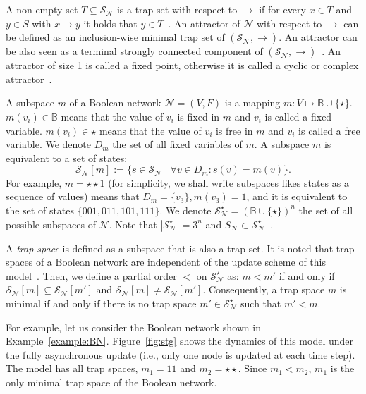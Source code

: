 \documentclass[preprint,12pt]{elsarticle}
\begin{document}
A non-empty set \(T \subseteq \mathcal{S}_{\mathcal{N}}\) is a trap set with respect to \(\rightarrow\) if for every \(x \in T\) and \(y \in S\) with \(x \rightarrow y\) it holds that \(y \in T\)~\cite{klarner2015computing}.
An attractor of \(\mathcal{N}\) with respect to \(\rightarrow\) can be defined as an inclusion-wise minimal trap set of \((\mathcal{S}_{\mathcal{N}}, \rightarrow)\).
An attractor can be also seen as a terminal strongly connected component of \((\mathcal{S}_{\mathcal{N}}, \rightarrow)\)~\cite{chatain2014characterization}.
An attractor of size 1 is called a fixed point, otherwise it is called a cyclic or complex attractor~\cite{klarner2015computing}.

A subspace \(m\) of a Boolean network \(\mathcal{N} = (V, F)\) is a mapping \(m \colon V \mapsto \mathbb{B} \cup \{\star\}\).
\(m(v_i) \in \mathbb{B}\) means that the value of \(v_i\) is fixed in \(m\) and \(v_i\) is called a fixed variable.
\(m(v_i) \in \star\) means that the value of \(v_i\) is free in \(m\) and \(v_i\) is called a free variable.
We denote \(D_m\) the set of all fixed variables of \(m\).
A subspace \(m\) is equivalent to a set of states:
\[
\mathcal{S}_{\mathcal{N}}[m] := \{s \in \mathcal{S}_{\mathcal{N}} \mid \forall v \in D_m \colon s(v) = m(v)\}.
\] For example, \(m = \star\star1\) (for simplicity, we shall write subspaces likes states as a sequence of values) means that \(D_m = \{v_3\}, m(v_3) = 1\), and it is equivalent to the set of states \(\{001, 011, 101, 111\}\).
We denote \(\mathcal{S}_{\mathcal{N}}^{\star} = (\mathbb{B} \cup \{\star\})^n\) the set of all possible subspaces of \(\mathcal{N}\).
Note that \(\left\vert\mathcal{S}_{\mathcal{N}}^{\star}\right\vert = 3^n\) and \(S_{\mathcal{N}} \subset \mathcal{S}_{\mathcal{N}}^{\star}\)~\cite{klarner2015computing}.

A \emph{trap space} is defined as a subspace that is also a trap set.
It is noted that trap spaces of a Boolean network are independent of the update scheme of this model~\cite{klarner2015computing}.
Then, we define a partial order \(<\) on \(\mathcal{S}_{\mathcal{N}}^{\star}\) as: \(m < m'\) if and only if \(\mathcal{S}_{\mathcal{N}}[m] \subseteq \mathcal{S}_{\mathcal{N}}[m']\) and \(\mathcal{S}_{\mathcal{N}}[m] \neq \mathcal{S}_{\mathcal{N}}[m']\).
Consequently, a trap space \(m\) is minimal if and only if there is no trap space \(m' \in \mathcal{S}_{\mathcal{N}}^{\star}\) such that \(m' < m\).

For example, let us consider the Boolean network shown in Example~\ref{example:BN}.
Figure~\ref{fig:stg} shows the dynamics of this model under the fully asynchronous update (i.e., only one node is updated at each time step).
The model has all trap spaces, \(m_1 = 11\) and \(m_2 = \star\star\).
Since \(m_1 < m_2\), \(m_1\) is the only minimal trap space of the Boolean network.
\end{document}
